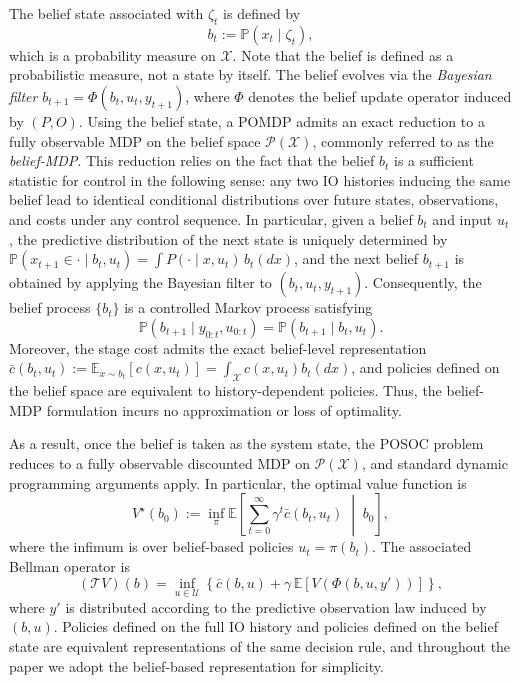 \documentclass[letterpaper, 10 pt, conference]{ieeeconf}
\begin{document}
The belief state associated with $\zeta_t$ is defined by
\begin{equation}
b_t := \mathbb{P}(x_t\mid \zeta_t),
\end{equation}
which is a probability measure on $\mathcal{X}$.
Note that the belief is defined as a probabilistic measure, not a state by itself.
The belief evolves via the \emph{Bayesian filter} $b_{t+1} = \Phi(b_t,u_t,y_{t+1})$, where $\Phi$ denotes the belief update operator induced by $(P,O)$. 
Using the belief state, a POMDP admits an exact reduction to a fully observable MDP on the belief space $\mathcal{P}(\mathcal{X})$, commonly referred to as the \emph{belief-MDP}.
This reduction relies on the fact that the belief $b_t$ is a sufficient statistic for control in the following sense:
any two IO histories inducing the same belief lead to identical conditional distributions over future states, observations, and costs under any control sequence.
In particular, given a belief $b_t$ and input $u_t$, the predictive distribution of the next state is uniquely determined by
$\mathbb{P}(x_{t+1}\in \cdot \mid b_t,u_t) = \int P(\cdot \mid x,u_t)\, b_t(dx)$,
and the next belief $b_{t+1}$ is obtained by applying the Bayesian filter to $(b_t,u_t,y_{t+1})$.
Consequently, the belief process $\{b_t\}$ is a controlled Markov process satisfying
\begin{equation}
\label{eq:belief-mdp}
\mathbb{P}(b_{t+1}\mid y_{0:t},u_{0:t}) = \mathbb{P}(b_{t+1}\mid b_t,u_t).
\end{equation}
Moreover, the stage cost admits the exact belief-level representation $\bar c(b_t,u_t):=\mathbb{E}_{x\sim b_t}[c(x,u_t)] = \int_{\mathcal{X}
}c(x,u_t)b_t(dx)$,
and policies defined on the belief space are equivalent to history-dependent policies.
Thus, the belief-MDP formulation incurs no approximation or loss of optimality.

As a result, once the belief is taken as the system state, the POSOC problem reduces to a fully observable discounted MDP on $\mathcal{P}(\mathcal{X})$, and standard dynamic programming arguments apply.
In particular, the optimal value function is
\begin{equation}
V^\star(b_0)
:=
\inf_{\pi}
\mathbb{E}\!\left[
\sum_{t=0}^{\infty}\gamma^t \bar c(b_t,u_t)
\;\middle|\; b_0
\right],
\end{equation}
where the infimum is over belief-based policies $u_t=\pi(b_t)$.
The associated Bellman operator is
\begin{equation}
(\mathcal{T}V)(b)
=
\inf_{u\in\mathcal{U}}
\left\{
\bar c(b,u)
+
\gamma\,\mathbb{E}\!\left[V(\Phi(b,u,y'))\right]
\right\},
\end{equation}
where $y'$ is distributed according to the predictive observation law induced by $(b,u)$.
Policies defined on the full IO history and policies defined on the belief state are equivalent representations of the same decision rule, and throughout the paper we adopt the belief-based representation for simplicity.
\end{document}
